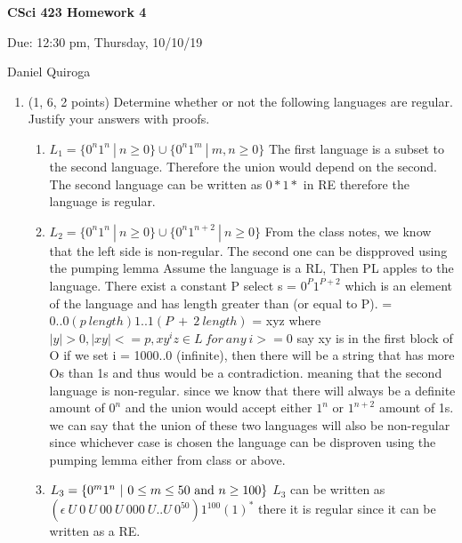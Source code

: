 \documentclass[11pt]{article}
\begin{document}
\begin{LARGE}
\centerline {\bf CSci 423 Homework 4}
\end{LARGE}
\vskip 0.25cm

\centerline{Due: 12:30 pm, Thursday, 10/10/19}
\centerline{Daniel Quiroga}

\begin{enumerate}

\item (1, 6, 2 points) Determine whether or not the following languages are regular. Justify your answers with proofs.
\begin{enumerate}
\item $L_1=\{0^n1^n\ |\ n\ge 0\}\cup \{0^n1^m\ |\ m,n\ge 0\}$ \newline
The first language is a subset to the second language. Therefore the union would depend on the second. The second language can be written as $0*1*$ in RE therefore the language is regular. 
\item $L_2=\{0^n1^n\ |\ n\ge0\}\cup\{0^n1^{n+2}\ |\ n\ge0\}$ \newline
From the class notes, we know that the left side is non-regular. The second one can be dispproved using the pumping lemma \newline 
Assume the language is a RL, Then PL apples to the language. \newline 
There exist a constant P \newline 
select s = $0^{P}1^{P+2}$ which is an element of the language and has length greater than (or equal to P). \newline 
= $0..0(p\ length) 1..1(P\ +\ 2\  length)$ = xyz \newline where $|y| > 0, |xy| <= p, xy^{i}z \in L \ for \  any \ i >=0$\newline 
say xy is in the first block of O if we set i = 1000..0 (infinite), then there will be a string that has more Os than 1s and thus would be a contradiction. meaning that the second language is non-regular. \newline since we know that there will always be a definite amount of $0^n$ and the union would accept either $1^n$ or $1^{n+2}$ amount of 1s. we can say that the union of these two languages will also be non-regular since whichever case is chosen the language can be disproven using the pumping lemma either from class or above. 
\item $L_3=\{0^m1^n\ |\ 0\le m\le 50{\rm\ and\ }n\ge 100\}$ \newline
$L_3$ can be written as $(\epsilon \ U\  0\  U\  00\  U \ 000\  U..U\  0^{50}) 1^{100} (1)^*$ there it is regular since it can be written as a RE. 
\end{enumerate}


\end{enumerate}
\end{document}

